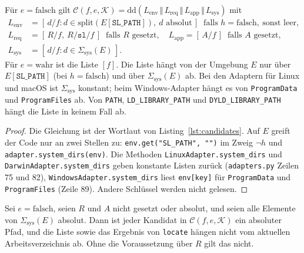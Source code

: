 \begin{satz}
	\label{satz:struktur}
	Für $e=\mathrm{falsch}$ gilt $\mathcal{C}(f,e,\mathcal{K})=\mathrm{dd}(L_{\mathrm{env}}\,\Vert\,L_{\mathrm{req}}\,\Vert\,L_{\mathrm{app}}\,\Vert\,L_{\mathrm{sys}})$ mit
	\begin{align*}
	L_{\mathrm{env}}&=[\,d/f : d\in\mathrm{split}(E[\texttt{SL\_PATH}]),\ d\text{ absolut}\,]\ \text{ falls }h=\mathrm{falsch},\ \text{sonst leer},\\
	L_{\mathrm{req}}&=[\,R/f,\ R/\texttt{sl}/f\,]\ \text{ falls }R\text{ gesetzt},\quad L_{\mathrm{app}}=[\,A/f\,]\ \text{ falls }A\text{ gesetzt},\\
	L_{\mathrm{sys}}&=[\,d/f : d\in\Sigma_{\mathrm{sys}}(E)\,].
	\end{align*}
	Für $e=\mathrm{wahr}$ ist die Liste $[f]$. Die Liste hängt von der Umgebung $E$ nur über $E[\texttt{SL\_PATH}]$ (bei $h=\mathrm{falsch}$) und über $\Sigma_{\mathrm{sys}}(E)$ ab. Bei den Adaptern für Linux und macOS ist $\Sigma_{\mathrm{sys}}$ konstant; beim Windows-Adapter hängt es von \texttt{ProgramData} und \texttt{ProgramFiles} ab. Von \texttt{PATH}, \texttt{LD\_LIBRARY\_PATH} und \texttt{DYLD\_LIBRARY\_PATH} hängt die Liste in keinem Fall ab.
\end{satz}

\begin{proof}
	Die Gleichung ist der Wortlaut von Listing~\ref{lst:candidates}. Auf $E$ greift der Code nur an zwei Stellen zu: \texttt{env.get("SL\_PATH", "")} im Zweig $\neg h$ und \texttt{adapter.system\_dirs(env)}. Die Methoden \texttt{LinuxAdapter.system\_dirs} und \texttt{DarwinAdapter.system\_dirs} geben konstante Listen zurück (\texttt{adapters.py} Zeilen 75 und 82), \texttt{WindowsAdapter.system\_dirs} liest \texttt{env[key]} für \texttt{ProgramData} und \texttt{ProgramFiles} (Zeile 89). Andere Schlüssel werden nicht gelesen.
\end{proof}

\begin{satz}
	\label{satz:cwd}
	Sei $e=\mathrm{falsch}$, seien $R$ und $A$ nicht gesetzt oder absolut, und seien alle Elemente von $\Sigma_{\mathrm{sys}}(E)$ absolut. Dann ist jeder Kandidat in $\mathcal{C}(f,e,\mathcal{K})$ ein absoluter Pfad, und die Liste sowie das Ergebnis von \texttt{locate} hängen nicht vom aktuellen Arbeitsverzeichnis ab. Ohne die Voraussetzung über $R$ gilt das nicht.
\end{satz}

